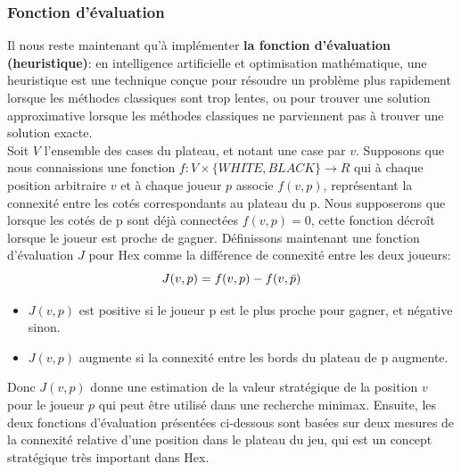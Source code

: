 \documentclass[a4paper,10pt]{article}
\begin{document}
\subsubsection{Fonction d'évaluation}
Il nous reste maintenant qu'à implémenter \textbf{la fonction d'évaluation (heuristique)}: en intelligence artificielle et optimisation mathématique, une heuristique est une technique conçue pour résoudre un problème plus rapidement lorsque les méthodes classiques sont trop lentes, ou pour trouver une solution approximative lorsque les méthodes classiques ne parviennent pas à trouver une solution exacte.\\
Soit $V$ l'ensemble des cases du plateau, et notant une case par $v$. Supposons que nous connaissions une fonction $f: V \times \{WHITE,BLACK \} \rightarrow R$ qui à chaque position arbitraire $v$ et à chaque joueur $p$ associe $f(v, p)$, représentant la connexité entre les cotés correspondants au plateau du p. Nous supposerons que lorsque les cotés de p sont déjà connectées $f (v, p) = 0$, cette fonction décroît lorsque le joueur est proche de gagner.
Définissons maintenant une fonction d'évaluation $J$ pour Hex comme la différence de connexité entre les deux joueurs:
$$J(v,p)=f(v,p)-f(v,\Bar{p})$$
\begin{itemize}
    \item $J(v,p)$ est positive si le joueur p est le plus proche pour gagner, et négative sinon.
    \item $J(v,p)$ augmente si la connexité entre les bords du plateau de p augmente. 
\end{itemize}
Donc $J(v, p)$ donne une estimation de la valeur stratégique de la position $v$ pour le joueur $p$ qui peut être utilisé dans une recherche minimax. Ensuite, les deux fonctions d'évaluation présentées ci-dessous sont basées sur deux mesures de la connexité relative d'une position dans le plateau du jeu, qui est un concept stratégique très important dans Hex.
\end{document}

